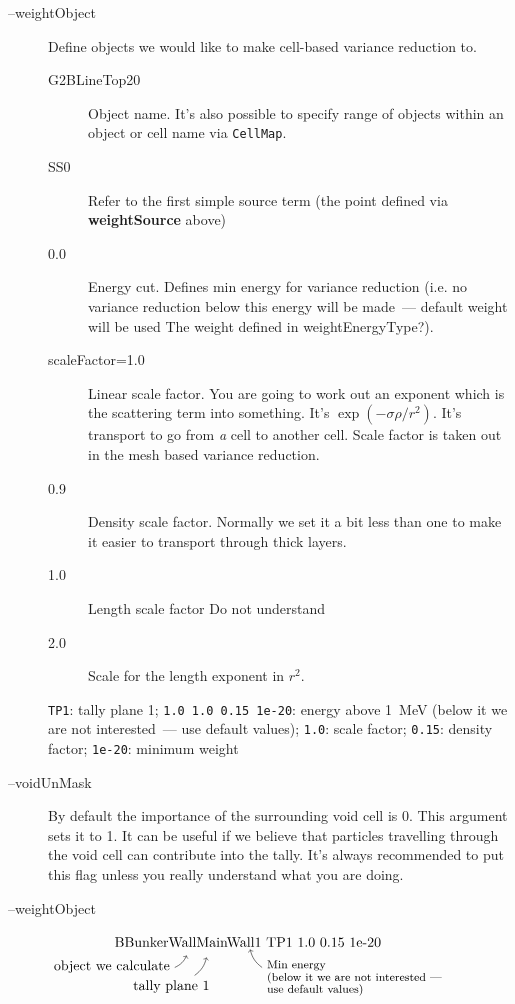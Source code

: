 \begin{description}
\item[--weightObject] Define objects we would like to make cell-based variance reduction to.
  \begin{description}
  \item[G2BLineTop20] Object name.  It's also possible to specify range of objects within an object or cell name via {\tt CellMap}.
    \item[SS0] Refer to the first simple source term (the point defined via {\bf weightSource} above)  %
    \item[0.0] Energy cut. Defines min energy for variance reduction (i.e. no variance reduction below this energy will be made~--- default weight will be used \alert{The weight defined in weightEnergyType?}).
    \item[scaleFactor=1.0] Linear scale factor. You are going to work out an exponent which is the scattering term into something. It's $\exp(-\sigma \rho / r^2)$.
      It's transport to go from {\em a} cell to another cell. \alert{Scale factor is taken out in the mesh based variance reduction.}
    \item[0.9] Density scale factor. Normally we set it a bit less than one to make it easier to transport through thick layers.
    \item[1.0] Length scale factor \alert{Do not understand}
    \item[2.0] Scale for the length exponent in $r^2$.
  \end{description}

 {\tt TP1}: tally plane 1;
  \mbox{\tt 1.0 1.0 0.15 1e-20}: energy above \SI{1}{\mega\electronvolt} (below it we are not interested~--- use default values);
  {\tt 1.0}: scale factor; 
  {\tt 0.15}: density factor; {\tt 1e-20}: minimum weight %
\item[--voidUnMask] By default the importance of the surrounding void cell is 0. This argument sets it to 1.
  It can be useful if we believe that particles travelling through the void cell can contribute into the tally.
  It's always recommended to put this flag unless you really understand what you are doing.

\item[--weightObject] 
$\underset{
  \begin{tikzpicture}
    \node[below left] at (-1,0) {object we calculate};  \draw[->](-1.0, -0.3) to[bend right=20] ++(0.3,2ex);
    \node[below left] at (0,-0.5) {tally plane 1};      \draw[->](-0.5, -0.5) to[bend right=20] ++(0.3,3ex);
    \node[below right] at (1.2,0.0) {\footnotesize{Min energy}};      \draw[->](1.2, -0.3) to[bend left=20] ++(-0.3,3ex);
    \node[below right] at (1.2,-0.3) {\footnotesize{(below it we are not interested~---}};
    \node[below right] at (1.2,-0.6) {\footnotesize{use default values)}};
  \end{tikzpicture}
}{\text{BBunkerWallMainWall1 TP1 1.0 0.15 1e-20}}$

\end{description}

